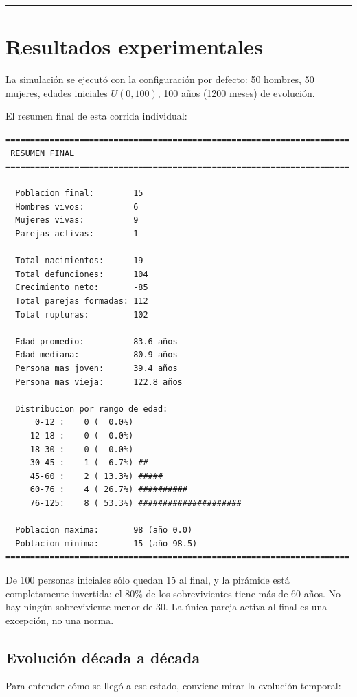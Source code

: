 \documentclass[12pt,a4paper]{article}
\begin{document}
\begin{center}\rule{0.7\linewidth}{0.4pt}\end{center}

\section{Resultados experimentales}

La simulación se ejecutó con la configuración por defecto: 50 hombres, 50 mujeres, edades iniciales $U(0, 100)$, 100 años (1200 meses) de evolución.

El resumen final de esta corrida individual:

\begin{lstlisting}
======================================================================
 RESUMEN FINAL
======================================================================

  Poblacion final:        15
  Hombres vivos:          6
  Mujeres vivas:          9
  Parejas activas:        1

  Total nacimientos:      19
  Total defunciones:      104
  Crecimiento neto:       -85
  Total parejas formadas: 112
  Total rupturas:         102

  Edad promedio:          83.6 años
  Edad mediana:           80.9 años
  Persona mas joven:      39.4 años
  Persona mas vieja:      122.8 años

  Distribucion por rango de edad:
      0-12 :    0 (  0.0%)
     12-18 :    0 (  0.0%)
     18-30 :    0 (  0.0%)
     30-45 :    1 (  6.7%) ##
     45-60 :    2 ( 13.3%) #####
     60-76 :    4 ( 26.7%) ##########
     76-125:    8 ( 53.3%) #####################

  Poblacion maxima:       98 (año 0.0)
  Poblacion minima:       15 (año 98.5)
======================================================================
\end{lstlisting}

De 100 personas iniciales sólo quedan 15 al final, y la pirámide está completamente invertida: el 80\% de los sobrevivientes tiene más de 60 años. No hay ningún sobreviviente menor de 30. La única pareja activa al final es una excepción, no una norma.

\subsection{Evolución década a década}

Para entender cómo se llegó a ese estado, conviene mirar la evolución temporal:
\end{document}
